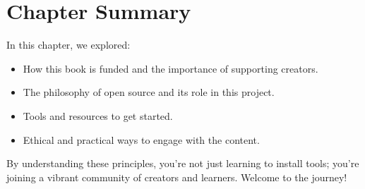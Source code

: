 \section*{Chapter Summary}
In this chapter, we explored:
\begin{itemize}
\item How this book is funded and the importance of supporting creators.
\item The philosophy of open source and its role in this project.
\item Tools and resources to get started.
\item Ethical and practical ways to engage with the content.
\end{itemize}

By understanding these principles, you\textquoteright re not just learning to install tools; you\textquoteright re joining a vibrant community of creators and learners. Welcome to the journey!
